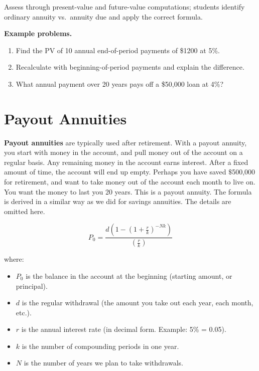 Assess through present-value and future-value computations; students
identify ordinary annuity vs.\ annuity due and apply the correct formula.

\textbf{Example problems.}
\begin{enumerate}
    \item Find the PV of 10 annual end-of-period payments of \$1200 at
          5\%.
    \item Recalculate with beginning-of-period payments and explain the
          difference.
    \item What annual payment over 20 years pays off a \$50{,}000 loan at
          4\%?
\end{enumerate}



\section{Payout Annuities}
\label{sec:payo-cbba}


\textbf{Payout annuities} are typically used after retirement. With a payout annuity, you start with money in the account, and pull money out of the account on a regular basis. Any remaining money in the account earns interest. After a fixed amount of time, the account will end up empty. Perhaps you have saved $\text{\$}$500,000 for retirement, and want to take money out of the account each month to live on. You want the money to last you 20 years. This is a payout annuity. The formula is derived in a similar way as we did for savings annuities. The details are omitted here.



$$P _{0} = \frac{d \left( 1 - \left( 1 + \frac{r}{k} \right)^{-Nk} \right)}{\left( \frac{r}{k} \right)}$$



where:



\begin{itemize}
    \item $P _{0}$ is the balance in the account at the beginning (starting amount, or principal).
    \item $d$ is the regular withdrawal (the amount you take out each year, each month, etc.).
    \item $r$ is the annual interest rate (in decimal form. Example: 5\% = 0.05).
    \item $k$ is the number of compounding periods in one year.
    \item $N$ is the number of years we plan to take withdrawals.
\end{itemize}


